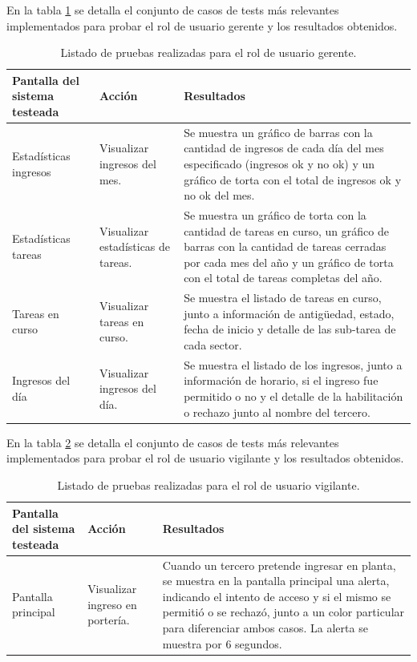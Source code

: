 En la tabla  \ref{tab:tablaTestsSistemaUsuGerente} se detalla el conjunto de casos de tests más relevantes implementados para probar el rol de usuario gerente y los resultados obtenidos. 

\begin{table}[h]
	\centering
	\caption[Tipos de pruebas sistema]{Listado de pruebas realizadas para el rol de usuario gerente.}
	\begin{tabular}{p{3.5cm} p{2.5cm} p{7cm}}

		\toprule
		\textbf{Pantalla del sistema testeada} & 
		\textbf{Acción} & 
		\textbf{Resultados} 
		\\
		\midrule
Estadísticas ingresos & Visualizar ingresos del mes.  & Se muestra un gráfico de barras con la cantidad de ingresos de cada día del mes especificado (ingresos ok y no ok) y un gráfico de torta con el total de ingresos ok y no ok del mes.  \\
Estadísticas tareas & Visualizar estadísticas de tareas.  & Se muestra un gráfico de torta con la cantidad de tareas en curso, un gráfico de barras con la cantidad de tareas cerradas por cada mes del año y un gráfico de torta con el total de tareas completas del año.  \\
Tareas en curso & Visualizar tareas en curso.
  & Se muestra el listado de tareas en curso, junto a información de antigüedad, estado, fecha de inicio y detalle de las sub-tarea de cada sector.  \\
Ingresos del día & Visualizar ingresos del día.  & Se muestra el listado de los ingresos, junto a información de horario, si el ingreso fue permitido o no y el detalle de la habilitación o rechazo junto al nombre del tercero.  \\

		\bottomrule
		\hline
	\end{tabular}
	\label{tab:tablaTestsSistemaUsuGerente}
\end{table}

En la tabla  \ref{tab:tablaTestsSistemaUsuPorteria} se detalla el conjunto de casos de tests más relevantes implementados para probar el rol de usuario vigilante y los resultados obtenidos. 

\begin{table}[h]
	\centering
	\caption[Tipos de pruebas sistema]{Listado de pruebas realizadas para el rol de usuario vigilante.}
	\begin{tabular}{p{3.5cm} p{2.5cm} p{7cm}}

		\toprule
		\textbf{Pantalla del sistema testeada} & 
		\textbf{Acción} & 
		\textbf{Resultados} 
		\\
		\midrule
Pantalla principal & Visualizar ingreso en portería.  & Cuando un tercero pretende ingresar en planta, se muestra en la pantalla principal una alerta, indicando el intento de acceso y si el mismo se permitió o se rechazó, junto a un color particular para diferenciar ambos casos. La alerta se muestra por 6 segundos. \\
		\bottomrule
		\hline
	\end{tabular}
	\label{tab:tablaTestsSistemaUsuPorteria}
\end{table}


